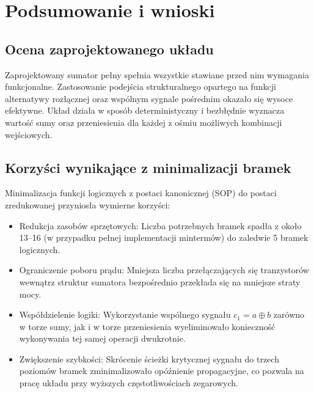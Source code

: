%   

\section{Podsumowanie i wnioski}

\subsection{Ocena zaprojektowanego układu}

Zaprojektowany sumator pełny spełnia wszystkie stawiane przed nim wymagania funkcjonalne. Zastosowanie podejścia strukturalnego opartego na funkcji alternatywy rozłącznej oraz wspólnym sygnale pośrednim okazało się wysoce efektywne. Układ działa w sposób deterministyczny i bezbłędnie wyznacza wartość sumy oraz przeniesienia dla każdej z ośmiu możliwych kombinacji wejściowych.

\subsection{Korzyści wynikające z minimalizacji bramek}

Minimalizacja funkcji logicznych z postaci kanonicznej (SOP) do postaci zredukowanej przyniosła wymierne korzyści:

\begin{itemize}
    \item Redukcja zasobów sprzętowych: Liczba potrzebnych bramek spadła z około 13--16 (w przypadku pełnej implementacji mintermów) do zaledwie 5 bramek logicznych.
    \item Ograniczenie poboru prądu: Mniejsza liczba przełączających się tranzystorów wewnątrz struktur sumatora bezpośrednio przekłada się na mniejsze straty mocy.
    \item Współdzielenie logiki: Wykorzystanie wspólnego sygnału $c_1 = a \oplus b$ zarówno w torze sumy, jak i w torze przeniesienia wyeliminowało konieczność wykonywania tej samej operacji dwukrotnie.
    \item Zwiększenie szybkości: Skrócenie ścieżki krytycznej sygnału do trzech poziomów bramek zminimalizowało opóźnienie propagacyjne, co pozwala na pracę układu przy wyższych częstotliwościach zegarowych.
\end{itemize}

